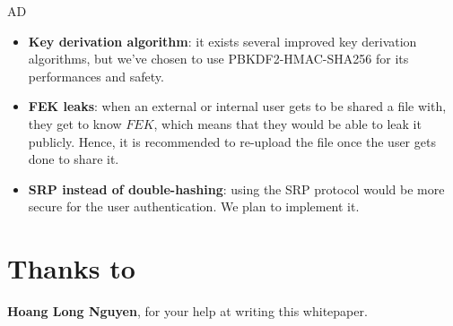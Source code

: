 AD\documentclass[a4paper,10pt]{article}
\begin{document}
\begin{itemize}
	\item \textbf{Key derivation algorithm}: it exists several improved key derivation
	algorithms, but we've chosen to use PBKDF2-HMAC-SHA256 for its performances and safety.
	\item \textbf{FEK leaks}: when an external or internal user gets to be shared a file with,
	they get to know $FEK$, which means that they would be able to leak it publicly. Hence,
	it is recommended to re-upload the file once the user gets done to share it.
	\item \textbf{SRP instead of double-hashing}: using the SRP protocol would be more
	secure for the user authentication. We plan to implement it.
\end{itemize}


\section{Thanks to}

\textbf{Hoang Long Nguyen}, for your help at writing this whitepaper.


\end{document}
